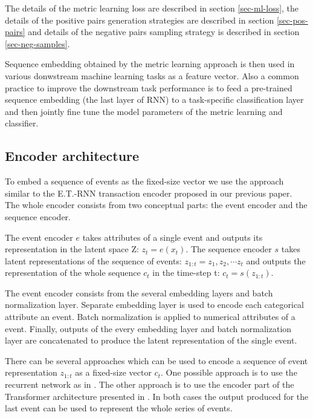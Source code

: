 \documentclass[sigconf]{acmart}
\begin{document}
The details of the metric learning loss are described in section \ref{sec-ml-loss}, the details of the positive pairs generation strategies are described in section \ref{sec-pos-pairs} and details of the negative pairs sampling strategy is described in section \ref{sec-neg-samples}.


Sequence embedding obtained by the metric learning approach is then used in various donwstream machine learning tasks as a feature vector. Also a common practice to improve the downstream task performance is to feed a pre-trained sequence embedding (the last layer of RNN) to a task-specific classification layer and then jointly fine tune the model parameters of the metric learning and classifier.

\subsection{Encoder architecture} \label{sec-enc-arch}

To embed a sequence of events as the fixed-size vector we use the approach similar to the E.T.-RNN\cite{10.1145/3292500.3330693} transaction encoder proposed in our previous paper. The whole encoder consists from two conceptual parts: the event encoder and the sequence encoder.

The event encoder $e$ takes attributes of a single event and outputs its representation in the latent space Z: $z_t = e(x_t)$. The sequence encoder $s$ takes latent representations of the sequence of events: $ z_{1:t} = z_1, z_2, \cdots z_t $ and outputs the representation of the whole sequence $c_t$ in the time-step t: $ c_t = s(z_{1:t}) $.

The event encoder consists from the several embedding layers and batch normalization \cite{10.5555/3045118.3045167} layer. Separate embedding layer is used to encode each categorical attribute an event. Batch normalization is applied to numerical attributes of a event. Finally, outputs of the every embedding layer and batch normalization layer are concatenated to produce the latent representation of the single event.

There can be several approaches which can be used to encode a sequence of event representation $z_{1:t}$ as a fixed-size vector $c_t$. One possible approach is to use the recurrent network as in \cite{Sutskever:2014:SSL:2969033.2969173}. The other approach is to use the encoder part of the Transformer architecture presented in \cite{DBLP:journals/corr/VaswaniSPUJGKP17}. In both cases the output produced for the last event can be used to represent the whole series of events.
\end{document}
